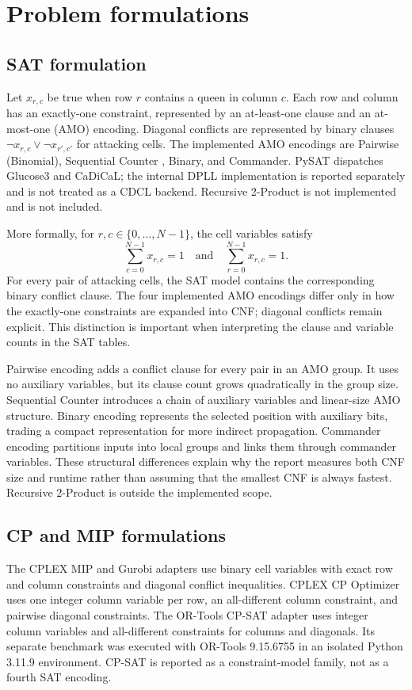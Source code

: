 \documentclass[a4paper,fleqn]{cas-sc}
\begin{document}
\section{Problem formulations}
\subsection{SAT formulation}
Let $x_{r,c}$ be true when row $r$ contains a queen in column $c$. Each row
and column has an exactly-one constraint, represented by an at-least-one clause
and an at-most-one (AMO) encoding. Diagonal conflicts are represented by
binary clauses $\lnot x_{r,c}\lor\lnot x_{r',c'}$ for attacking cells. The
implemented AMO encodings are Pairwise (Binomial), Sequential Counter
\cite{sinz}, Binary, and Commander. PySAT dispatches Glucose3 and CaDiCaL;
the internal DPLL implementation is reported separately and is not treated as
a CDCL backend. Recursive 2-Product is not implemented and is not included.

More formally, for $r,c\in\{0,\ldots,N-1\}$, the cell variables satisfy
\begin{equation}
\sum_{c=0}^{N-1} x_{r,c}=1 \quad\text{and}\quad
\sum_{r=0}^{N-1} x_{r,c}=1.
\end{equation}
For every pair of attacking cells, the SAT model contains the corresponding
binary conflict clause. The four implemented AMO encodings differ only in how
the exactly-one constraints are expanded into CNF; diagonal conflicts remain
explicit. This distinction is important when interpreting the clause and
variable counts in the SAT tables.

Pairwise encoding adds a conflict clause for every pair in an AMO group. It
uses no auxiliary variables, but its clause count grows quadratically in the
group size. Sequential Counter introduces a chain of auxiliary variables and
linear-size AMO structure. Binary encoding represents the selected position
with auxiliary bits, trading a compact representation for more indirect
propagation. Commander encoding partitions inputs into local groups and links
them through commander variables. These structural differences explain why
the report measures both CNF size and runtime rather than assuming that the
smallest CNF is always fastest. Recursive 2-Product is outside the implemented
scope.

\subsection{CP and MIP formulations}
The CPLEX MIP and Gurobi adapters use binary cell variables with exact row and
column constraints and diagonal conflict inequalities. CPLEX CP Optimizer uses
one integer column variable per row, an all-different column constraint, and
pairwise diagonal constraints. The OR-Tools CP-SAT adapter uses integer column
variables and all-different constraints for columns and diagonals. Its separate
benchmark was executed with OR-Tools 9.15.6755 in an isolated Python 3.11.9
environment. CP-SAT is reported as a constraint-model family, not as a fourth
SAT encoding.
\end{document}
